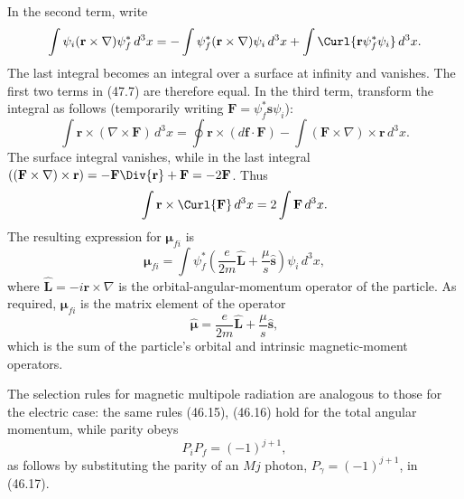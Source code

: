 In the second term, write
\[
\int\psi_i(\mathbf r\times\nabla)\psi_f^*\,d^3x
=-\int\psi_f^*(\mathbf r\times\nabla)\psi_i\,d^3x
+\int\Curl{\mathbf r\psi_f^*\psi_i}\,d^3x.
\]
The last integral becomes an integral over a surface at infinity and vanishes. The first two terms in (47.7) are therefore equal. In the third term, transform the integral as follows (temporarily writing $\mathbf F=\psi_f^*\mathbf s\psi_i$):
\[
\int\mathbf r\times(\nabla\times\mathbf F)\,d^3x
=\oint\mathbf r\times(d\mathbf f\cdot\mathbf F)
-\int(\mathbf F\times\nabla)\times\mathbf r\,d^3x.
\]
The surface integral vanishes, while in the last integral
$((\mathbf F\times\nabla)\times\mathbf r)=-\mathbf F\Div{\mathbf r}+\mathbf F=-2\mathbf F$. Thus
\[
\int\mathbf r\times\Curl{\mathbf F}\,d^3x=2\int\mathbf F\,d^3x.
\]
The resulting expression for $\boldsymbol\mu_{fi}$ is
\begin{equation}
\boldsymbol\mu_{fi}=\int\psi_f^*
\left(\frac e{2m}\widehat{\mathbf L}+\frac\mu s\widehat{\mathbf s}\right)
\psi_i\,d^3x,
\tag{47.8}
\end{equation}
where $\widehat{\mathbf L}=-i\mathbf r\times\nabla$ is the orbital-angular-momentum operator of the particle. As required, $\boldsymbol\mu_{fi}$ is the matrix element of the operator
\begin{equation}
\widehat{\boldsymbol\mu}=\frac e{2m}\widehat{\mathbf L}+\frac\mu s\widehat{\mathbf s},
\tag{47.9}
\end{equation}
which is the sum of the particle's orbital and intrinsic magnetic-moment operators.

The selection rules for magnetic multipole radiation are analogous to those for the electric case: the same rules (46.15), (46.16) hold for the total angular momentum, while parity obeys
\begin{equation}
P_iP_f=(-1)^{j+1},
\tag{47.10}
\end{equation}
as follows by substituting the parity of an $Mj$ photon, $P_\gamma=(-1)^{j+1}$, in (46.17).
